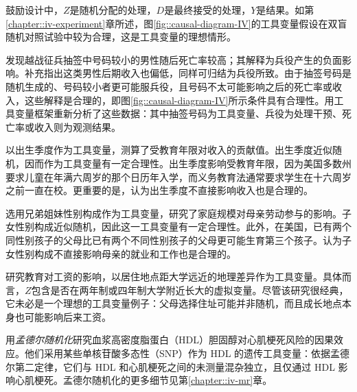 \begin{example} 
鼓励设计中，$Z$是随机分配的处理，$D$是最终接受的处理，$Y$是结果。如第\ref{chapter::iv-experiment}章所述，图\ref{fig::causal-diagram-IV}的工具变量假设在双盲随机对照试验中较为合理，这是工具变量的理想情形。 
\end{example}


 
 
 \begin{example}
 \citet{hearst1986delayed}发现越战征兵抽签中号码较小的男性随后死亡率较高；其解释为兵役产生的负面影响。\citet{angrist1990lifetime}补充指出这类男性后期收入也偏低，同样可归结为兵役所致。由于抽签号码是随机生成的、号码较小者更可能服兵役，且号码不太可能影响之后的死亡率或收入，这些解释是合理的，即图\ref{fig::causal-diagram-IV}所示条件具有合理性。\citet{angrist1996identification}用工具变量框架重新分析了这些数据：其中抽签号码为工具变量、兵役为处理干预、死亡率或收入则为观测结果。
\end{example}




\begin{example}
\citet{angrist1991does}以出生季度作为工具变量，测算了受教育年限对收入的贡献值。出生季度近似随机，因而作为工具变量有一定合理性。出生季度影响受教育年限，因为美国多数州要求儿童在年满六周岁的那个日历年入学，而义务教育法通常要求学生在十六周岁之前一直在校。更重要的是，认为出生季度不直接影响收入也是合理的。
\end{example}


\begin{example}
\citet{angrist1998children}选用兄弟姐妹性别构成作为工具变量，研究了家庭规模对母亲劳动参与的影响。子女性别构成近似随机，因此这一工具变量有一定合理性。此外，在美国，已有两个同性别孩子的父母比已有两个不同性别孩子的父母更可能生育第三个孩子。认为子女性别构成不直接影响母亲的就业和工作也是合理的。
\end{example}


\begin{example}\label{example::Card1993}
\citet{card1993using}研究教育对工资的影响，以居住地点距大学远近的地理差异作为工具变量。具体而言，$Z$包含是否在两年制或四年制大学附近长大的虚拟变量。尽管该研究很经典，它未必是一个理想的工具变量例子：父母选择住址可能并非随机，而且成长地点本身也可能影响后来工资。 
\end{example}



\begin{example}
\citet{voight2012plasma}用{\it 孟德尔随机化}研究血浆高密度脂蛋白（HDL）胆固醇对心肌梗死风险的因果效应。他们采用某些单核苷酸多态性（SNP）作为 HDL 的遗传工具变量：依据孟德尔第二定律，它们与 HDL 和心肌梗死之间的未测量混杂独立，且仅通过 HDL 影响心肌梗死。孟德尔随机化的更多细节见第\ref{chapter::iv-mr}章。 
\end{example}



